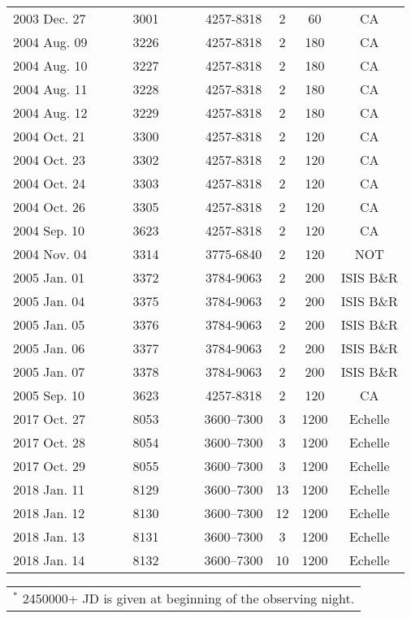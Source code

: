 \documentclass[fleqn,usenatbib]{mnras}
\begin{document}
\begin{table}
\begin{tabular}{lccccc}
2003 Dec. 27   & 3001    &    4257-8318    &             2 &   60   &  CA         \\
2004 Aug. 09   & 3226    &    4257-8318    &             2 &  180    &  CA         \\ 
2004 Aug. 10  & 3227    &    4257-8318    &             2 &  180   &  CA         \\ 
2004 Aug. 11  & 3228    &    4257-8318    &             2 &  180    &  CA         \\ 
2004 Aug. 12  & 3229    &    4257-8318    &             2 &  180    &  CA         \\ 
2004 Oct. 21  & 3300    &    4257-8318    &             2 &  120    &  CA         \\ 
2004 Oct. 23  & 3302    &    4257-8318    &             2 &  120    &  CA         \\ 
2004 Oct. 24  & 3303    &    4257-8318    &             2 &  120    &  CA         \\ 
2004 Oct. 26  & 3305    &    4257-8318    &             2 &  120    &  CA         \\ 
2004 Sep. 10  & 3623    &    4257-8318    &             2 &  120    &  CA         \\
2004 Nov. 04  & 3314    &   3775-6840     &                  2 &  120    &  NOT      \\ 
2005 Jan. 01   & 3372    &    3784-9063    &             2  &  200    & ISIS B\&R  \\
2005 Jan. 04   & 3375    &    3784-9063    &             2  &  200    & ISIS B\&R  \\
2005 Jan. 05   & 3376    &    3784-9063    &             2  &  200    & ISIS B\&R  \\
2005 Jan. 06   & 3377    &    3784-9063    &             2  &  200    & ISIS B\&R  \\
2005 Jan. 07   & 3378    &    3784-9063    &             2  &  200    & ISIS B\&R  \\
2005 Sep. 10  & 3623         &    4257-8318    &             2 &   120   &  CA         \\  
\hline
2017 Oct. 27     & ~~~~~8053~~~~~    & 3600--7300 & 3 & 1200 & Echelle \\
2017 Oct. 28     & 8054     & 3600--7300 & 3 & 1200 & Echelle \\
2017 Oct. 29     & 8055     & 3600--7300 & 3 & 1200 & Echelle \\
2018 Jan. 11     & 8129     & 3600--7300 & 13 & 1200 & Echelle \\
2018 Jan. 12     & 8130     & 3600--7300 & 12 & 1200 & Echelle \\
2018 Jan. 13     & 8131     & 3600--7300 & 3 & 1200 & Echelle \\
2018 Jan. 14     & 8132     & 3600--7300 & 10 & 1200 & Echelle  \\ \hline
       
 \end{tabular}

\begin{tabular}{l}
$^*$ 2450000+ 
JD is given at beginning of the observing night.
\end{tabular}
\end{table}
\end{document}
